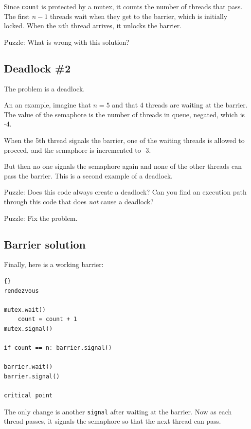 \documentclass{book}
\newcommand{\clearemptydoublepage}{\newpage\cleardoublepage}
\begin{document}
Since {\tt count} is protected by a mutex, it counts the number of
threads that pass.  The first $n-1$ threads wait when they get to the
barrier, which is initially locked.  When the $n$th thread arrives, it
unlocks the barrier.

Puzzle:  What is wrong with this solution?


\clearemptydoublepage
\subsection{Deadlock \#2}

The problem is a deadlock.

An an example, imagine that $n=5$
and that 4 threads are waiting at the barrier.  The value
of the semaphore is the number of threads in queue, negated, 
which is -4.

When the 5th thread signals the barrier, one of the waiting
threads is allowed to proceed, and the semaphore is incremented
to -3.

But then no one signals the semaphore again and none of the
other threads can pass the barrier.
This is a second example of a deadlock.

Puzzle: Does this code always create a deadlock?  Can you find an
execution path through this code that does {\em not} cause a deadlock?

Puzzle: Fix the problem.


\clearemptydoublepage
\subsection{Barrier solution}
\label{barrier}

Finally, here is a working barrier:

\begin{latin}
\begin{latin}
\begin{lstlisting}[title={Barrier solution}]{}
rendezvous

mutex.wait()
    count = count + 1
mutex.signal()

if count == n: barrier.signal()

barrier.wait()
barrier.signal()

critical point
\end{lstlisting}
\end{latin}
\end{latin}

The only change is another {\tt signal} after waiting
at the barrier.  Now as each thread passes, it signals the
semaphore so that the next thread can pass.
\end{document}
